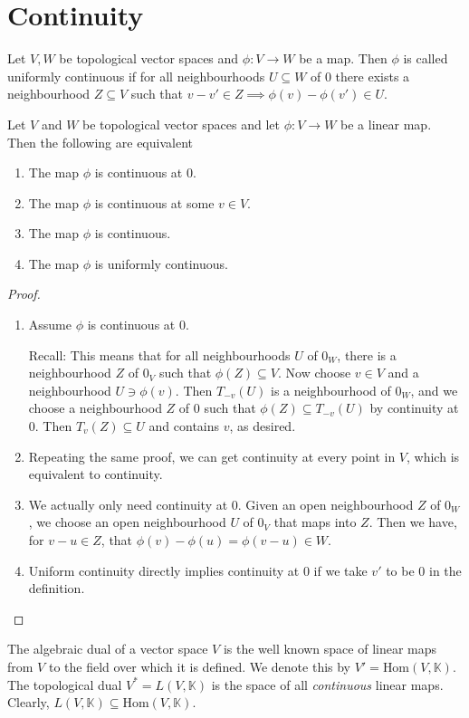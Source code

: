 \documentclass[twoside,symmetric, openany, 12pt]{./tuftebook}
\theoremstyle{definition}
\theoremstyle{definition}
\theoremstyle{definition}
\newenvironment{parts}{\begin{enumerate}[label=(\alph*)]}{\end{enumerate}}
\begin{document}
	\section{Continuity}
	\begin{Definition}
		Let $V,W$ be topological vector spaces and $\phi:V\to W$ be a map. Then $\phi$ is called uniformly continuous if for all neighbourhoods $U\subseteq W$ of $0$ there exists a neighbourhood $Z\subseteq V$ such that $v-v'\in Z\implies \phi(v)-\phi(v')\in U$.
	\end{Definition}
	\begin{Theorem}
		Let $V$ and $W$ be topological vector spaces and let $\phi:V\to W$ be a linear map. Then the following are equivalent
		\begin{parts}
			\item The map $\phi$ is continuous at $0$.
			\item The map $\phi$ is continuous at some $v\in V$.
			\item The map $\phi$ is continuous.
			\item The map $\phi$ is uniformly continuous.
		\end{parts}
	\end{Theorem}
	\begin{proof}
		\begin{enumerate}
			\item Assume $\phi$ is continuous at 0. 
			
			Recall: This means that for all neighbourhoods $U$ of $0_W$, there is a neighbourhood $Z$ of $0_V$ such that $\phi(Z)\subseteq V$. Now choose $v\in V$ and a neighbourhood $U\ni \phi(v)$. Then $T_{-v}(U)$ is a neighbourhood of $0_W$, and we choose a neighbourhood $Z$ of $0$ such that $\phi(Z)\subseteq T_{-v}(U)$ by continuity at $0$. Then $T_v(Z)\subseteq U$ and contains $v$, as desired.
			\item Repeating the same proof, we can get continuity at every point in $V$, which is equivalent to continuity.
			\item We actually only need continuity at 0. Given an open neighbourhood $Z$ of $0_W$, we choose an open neighbourhood $U$ of $0_V$ that maps into $Z$. Then we have, for $v-u\in Z$, that $\phi(v)-\phi(u)=\phi(v-u)\in W$.
			\item Uniform continuity directly implies continuity at 0 if we take $v'$ to be $0$ in the definition. \qedhere
		\end{enumerate}
	\end{proof}
	\begin{Definition}
		The algebraic dual of a vector space $V$ is the well known space of linear maps from $V$ to the field over which it is defined. We denote this by $V'=\text{Hom}(V,\mathbb{K})$. The topological dual $V^*=L(V, \mathbb{K})$ is the space of all \emph{continuous} linear maps. Clearly, $L(V, \mathbb{K})\subseteq \text{Hom}(V,\mathbb{K})$.
	\end{Definition}
\end{document}
